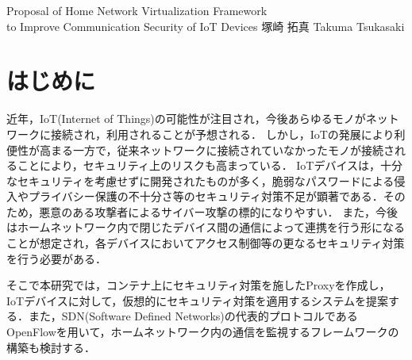\documentclass[a4paper,10pt,twocolumn,uplatex]{jsarticle}
\date{11}
\begin{document}
{Proposal of Home Network Virtualization Framework\\to Improve Communication Security of IoT Devices}
{塚崎 拓真}
{Takuma Tsukasaki}

\section{はじめに}
近年，IoT(Internet of Things)の可能性が注目され，今後あらゆるモノがネットワークに接続され，利用されることが予想される．
しかし，IoTの発展により利便性が高まる一方で，従来ネットワークに接続されていなかったモノが接続されることにより，セキュリティ上のリスクも高まっている\cite{security}．
IoTデバイスは，十分なセキュリティを考慮せずに開発されたものが多く，脆弱なパスワードによる侵入やプライバシー保護の不十分さ等のセキュリティ対策不足が顕著である\cite{owasp}．そのため，悪意のある攻撃者によるサイバー攻撃の標的になりやすい．
また，今後はホームネットワーク内で閉じたデバイス間の通信によって連携を行う形になることが想定され\cite{d2d}，各デバイスにおいてアクセス制御等の更なるセキュリティ対策を行う必要がある．\par
そこで本研究では，コンテナ上にセキュリティ対策を施したProxyを作成し，IoTデバイスに対して，仮想的にセキュリティ対策を適用するシステムを提案する．また，SDN(Software Defined Networks)の代表的プロトコルであるOpenFlowを用いて，ホームネットワーク内の通信を監視するフレームワークの構築も検討する．
\end{document}
